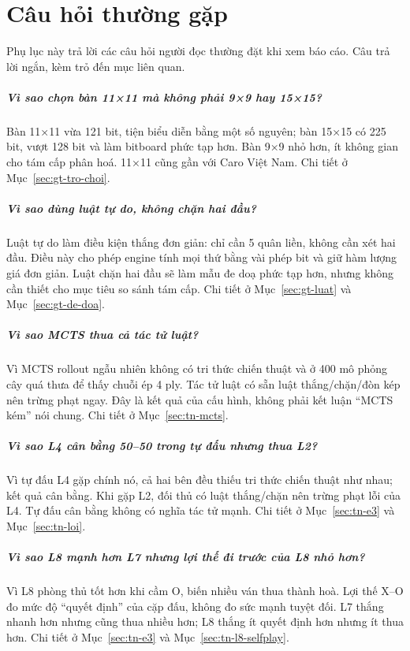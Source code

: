 \chapter{Câu hỏi thường gặp}
\label{app:faq}

Phụ lục này trả lời các câu hỏi người đọc thường đặt khi xem báo cáo. Câu trả lời ngắn, kèm
trỏ đến mục liên quan.

\paragraph{Vì sao chọn bàn 11×11 mà không phải 9×9 hay 15×15?}
Bàn 11×11 vừa 121 bit, tiện biểu diễn bằng một số nguyên; bàn 15×15 có 225 bit, vượt 128 bit
và làm bitboard phức tạp hơn. Bàn 9×9 nhỏ hơn, ít không gian cho tám cấp phân hoá. 11×11 cũng
gần với Caro Việt Nam. Chi tiết ở Mục~\ref{sec:gt-tro-choi}.

\paragraph{Vì sao dùng luật tự do, không chặn hai đầu?}
Luật tự do làm điều kiện thắng đơn giản: chỉ cần 5 quân liền, không cần xét hai đầu. Điều này
cho phép engine tính mọi thứ bằng vài phép bit và giữ hàm lượng giá đơn giản. Luật chặn hai
đầu sẽ làm mẫu đe doạ phức tạp hơn, nhưng không cần thiết cho mục tiêu so sánh tám cấp. Chi
tiết ở Mục~\ref{sec:gt-luat} và Mục~\ref{sec:gt-de-doa}.

\paragraph{Vì sao MCTS thua cả tác tử luật?}
Vì MCTS rollout ngẫu nhiên không có tri thức chiến thuật và ở 400 mô phỏng cây quá thưa để thấy
chuỗi ép 4 ply. Tác tử luật có sẵn luật thắng/chặn/đòn kép nên trừng phạt ngay. Đây là kết quả
của cấu hình, không phải kết luận ``MCTS kém'' nói chung. Chi tiết ở Mục~\ref{sec:tn-mcts}.

\paragraph{Vì sao L4 cân bằng 50–50 trong tự đấu nhưng thua L2?}
Vì tự đấu L4 gặp chính nó, cả hai bên đều thiếu tri thức chiến thuật như nhau; kết quả cân
bằng. Khi gặp L2, đối thủ có luật thắng/chặn nên trừng phạt lỗi của L4. Tự đấu cân bằng không
có nghĩa tác tử mạnh. Chi tiết ở Mục~\ref{sec:tn-e3} và Mục~\ref{sec:tn-loi}.

\paragraph{Vì sao L8 mạnh hơn L7 nhưng lợi thế đi trước của L8 nhỏ hơn?}
Vì L8 phòng thủ tốt hơn khi cầm O, biến nhiều ván thua thành hoà. Lợi thế X–O đo mức độ
``quyết định'' của cặp đấu, không đo sức mạnh tuyệt đối. L7 thắng nhanh hơn nhưng cũng thua
nhiều hơn; L8 thắng ít quyết định hơn nhưng ít thua hơn. Chi tiết ở Mục~\ref{sec:tn-e3} và
Mục~\ref{sec:tn-l8-selfplay}.

